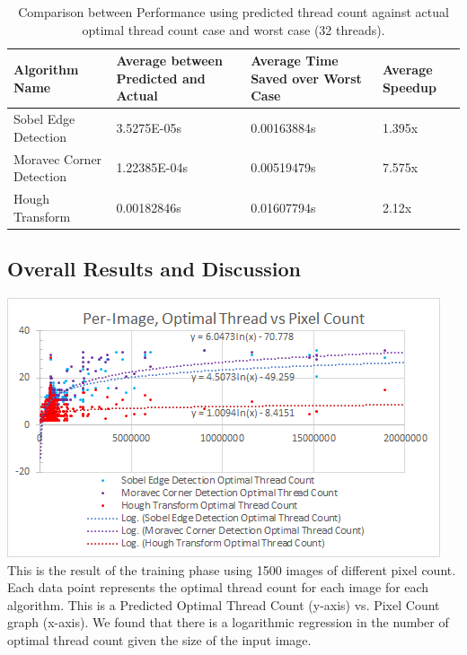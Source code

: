 \documentclass{article}
\begin{document}
\begin{center}
\begin{table}
\begin{tabular}{|p{3cm}||p{3cm}|p{3cm}|p{3cm}|}
 \hline
 Algorithm Name & Average between Predicted and Actual & Average Time Saved over Worst Case & Average Speedup \\ 
 \hline
 \hline
 Sobel Edge Detection & 3.5275E-05s & 0.00163884s & 1.395x \\  
 \hline
 Moravec Corner Detection & 1.22385E-04s & 0.00519479s & 7.575x \\
 \hline
 Hough Transform & 0.00182846s & 0.01607794s & 2.12x \\
  \hline
\end{tabular}
\caption{\label{tab:table-name}Comparison between Performance using predicted thread count against actual optimal thread count case and worst case (32 threads).}
\end{table}
\end{center}


    \subsection{Overall Results and Discussion}
    \includegraphics[width=\textwidth]{source/images/logarithmic_graph.png}
    This is the result of the training phase using 1500 images of different pixel count. Each data point represents the optimal thread count for each image for each algorithm. This is a Predicted Optimal Thread Count (y-axis) vs. Pixel Count graph (x-axis). We found that there is a logarithmic regression in the number of optimal thread count given the size of the input image.
\end{document}
